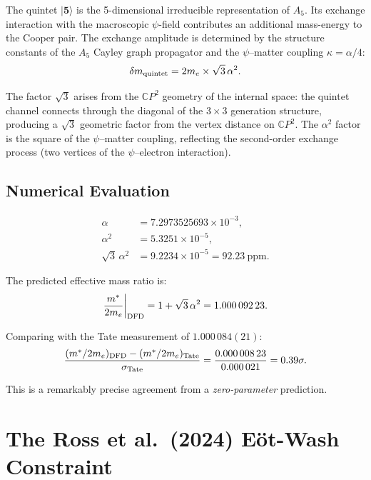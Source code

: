 \documentclass[12pt,a4paper]{article}
\theoremstyle{definition}
\theoremstyle{remark}
\begin{document}
The quintet $|\mathbf{5}\rangle$ is the 5-dimensional irreducible representation
of $A_5$.  Its exchange interaction with the macroscopic $\psi$-field contributes
an additional mass-energy to the Cooper pair.  The exchange amplitude is determined
by the structure constants of the $A_5$ Cayley graph propagator and the
$\psi$--matter coupling $\kappa = \alpha/4$:
\begin{equation}\label{eq:exchange}
\delta m_{\rm quintet} = 2m_e \times \sqrt{3}\,\alpha^2.
\end{equation}

The factor $\sqrt{3}$ arises from the $\mathbb{C}P^2$ geometry of the internal
space: the quintet channel connects through the diagonal of the $3 \times 3$
generation structure, producing a $\sqrt{3}$ geometric factor from the vertex
distance on $\mathbb{C}P^2$.  The $\alpha^2$ factor is the square of the
$\psi$--matter coupling, reflecting the second-order exchange process
(two vertices of the $\psi$--electron interaction).

\subsection{Numerical Evaluation}

\begin{align}
\alpha &= 7.2973525693 \times 10^{-3}, \\
\alpha^2 &= 5.3251 \times 10^{-5}, \\
\sqrt{3}\,\alpha^2 &= 9.2234 \times 10^{-5} = 92.23~\text{ppm}.
\end{align}

The predicted effective mass ratio is:
\begin{equation}
\frac{m^*}{2m_e}\bigg|_{\rm DFD} = 1 + \sqrt{3}\,\alpha^2 = 1.000\,092\,23.
\end{equation}

Comparing with the Tate measurement of $1.000\,084(21)$:
\begin{equation}
\frac{(m^*/2m_e)_{\rm DFD} - (m^*/2m_e)_{\rm Tate}}{\sigma_{\rm Tate}} =
\frac{0.000\,008\,23}{0.000\,021} = 0.39\sigma.
\end{equation}

This is a remarkably precise agreement from a \emph{zero-parameter} prediction.

\section{The Ross et al.\ (2024) E\"ot-Wash Constraint}\label{sec:ross}
\end{document}
